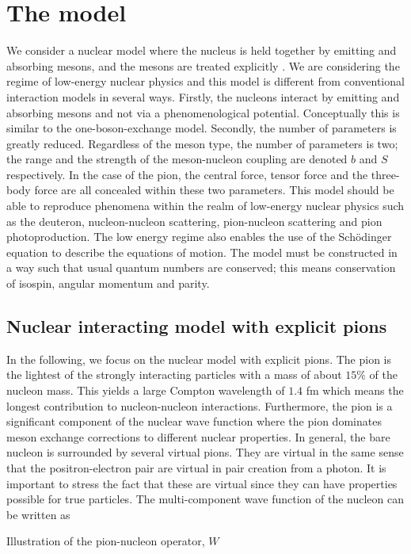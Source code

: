 \chapter{The model}\label{Decsofmodel}

We consider a nuclear model where the nucleus is held together by emitting and absorbing mesons, and the mesons are treated explicitly \cite[]{Mesons}. We are considering the regime of low-energy nuclear physics and this model is different from conventional interaction models in several ways. Firstly, the nucleons interact by emitting and absorbing mesons and not via a phenomenological potential. Conceptually this is similar to the one-boson-exchange model. Secondly, the number of parameters is greatly reduced. Regardless of the meson type, the number of parameters is two; the range and the strength of the meson-nucleon coupling are denoted $b$ and $S$ respectively. In the case of the pion, the central force, tensor force and the three-body force are all concealed within these two parameters. This model should be able to reproduce phenomena within the realm of low-energy nuclear physics such as the deuteron, nucleon-nucleon scattering, pion-nucleon scattering and pion photoproduction. The low energy regime also enables the use of the Schödinger equation to describe the equations of motion. The model must be constructed in a way such that usual quantum numbers are conserved; this means conservation of isospin, angular momentum and parity. 


\section{Nuclear interacting model with explicit pions }\label{sec:model}

In the following, we focus on the nuclear model with explicit pions. The pion is the lightest of the strongly interacting particles with a mass of about $15\%$ of the nucleon mass. This yields a large Compton wavelength of $1.4$ fm which means the longest contribution to nucleon-nucleon interactions. Furthermore, the pion is a significant component of the nuclear wave function where the pion dominates meson exchange corrections to different nuclear properties. In general, the bare nucleon is surrounded by several virtual pions. 
They are virtual in the same sense that the positron-electron pair are virtual in pair creation from a photon. It is important to stress the fact that these are virtual since they can have properties possible for true particles. The multi-component wave function of the nucleon can be written as
\begin{marginfigure}
	\centering
	
	\caption{Illustration of the pion-nucleon operator, $W$}
	\label{fig:superposition}
\end{marginfigure}

